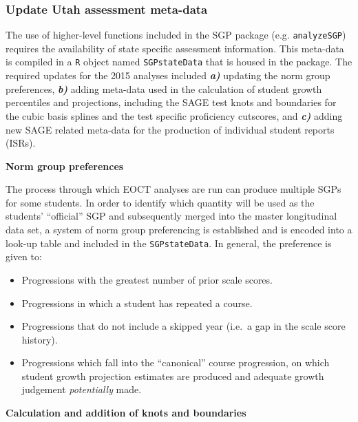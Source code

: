 \documentclass[12pt]{article}
\begin{document}
\subsubsection{Update Utah assessment
meta-data}\label{update-utah-assessment-meta-data}

The use of higher-level functions included in the SGP package (e.g.
\texttt{analyzeSGP}) requires the availability of state specific
assessment information. This meta-data is compiled in a \texttt{R}
object named \texttt{SGPstateData} that is housed in the package. The
required updates for the 2015 analyses included \textbf{\emph{a)}}
updating the norm group preferences, \textbf{\emph{b)}} adding meta-data
used in the calculation of student growth percentiles and projections,
including the SAGE test knots and boundaries for the cubic basis splines
and the test specific proficiency cutscores, and \textbf{\emph{c)}}
adding new SAGE related meta-data for the production of individual
student reports (ISRs).

\textbf{Norm group preferences}

The process through which EOCT analyses are run can produce multiple
SGPs for some students. In order to identify which quantity will be used
as the students' ``official'' SGP and subsequently merged into the
master longitudinal data set, a system of norm group preferencing is
established and is encoded into a look-up table and included in the
\texttt{SGPstateData}. In general, the preference is given to:

\begin{itemize}
\itemsep1pt\parskip0pt
\item
  Progressions with the greatest number of prior scale scores.
\item
  Progressions in which a student has repeated a course.
\item
  Progressions that do not include a skipped year (i.e.~a gap in the
  scale score history).
\item
  Progressions which fall into the ``canonical'' course progression, on
  which student growth projection estimates are produced and adequate
  growth judgement \emph{potentially} made.
\end{itemize}

\textbf{Calculation and addition of knots and boundaries}
\end{document}

